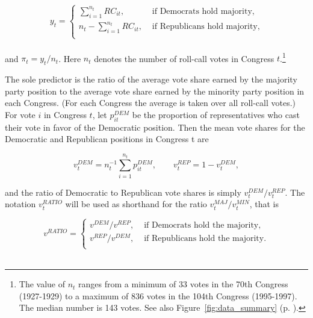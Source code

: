 \begin{equation*}
y_t =
\begin{cases} \sum_{i=1}^{n_t} RC_{it}, & \text{ if Democrats hold majority}, \\[10pt]
n_t - \sum_{i=1}^{n_t} RC_{it}, & \text{ if Republicans hold majority,} \\
\end{cases}
\end{equation*}
~\\[-12pt]
 
\noindent and $\pi_t = y_t / n_t$. Here $n_t$ denotes the number of roll-call votes in Congress $t$.\footnote{The value of $n_t$ ranges from a minimum of 33 votes in the 70th Congress (1927-1929) to a maximum of 836 votes in the 104th Congress (1995-1997). The median number is 143 votes. See also Figure~\ref{fig:data_summary} (p. \pageref{fig:data_summary}).} 

The sole predictor is the ratio of the average vote share earned by the majority party position to the average vote share earned by the minority party position in each Congress.  (For each Congress the average is taken over all roll-call votes.)  For vote $i$ in Congress $t$, let $p_{it}^{DEM}$ be the proportion of representatives who cast their vote in favor of the Democratic position.  Then the mean vote shares for the Democratic and Republican positions in Congress t are

\begin{equation*}
v_t^{DEM} = n_t^{-1} \sum_{i=1}^{n_t} p_{it}^{DEM}, \qquad v_t^{REP} = 1 - v_t^{DEM},
\end{equation*}

\noindent and the ratio of Democratic to Republican vote shares is simply $v_t^{DEM} / v_t^{REP}$. The notation $v_t^{RATIO}$ will be used as shorthand for the ratio $v_t^{MAJ} / v_t^{MIN}$, that is 

\begin{equation*}
v^{RATIO} = 
\begin{cases} 
v^{DEM} / v^{REP}, & \text{ if Democrats hold the majority,} \\[10pt]
v^{REP} / v^{DEM}, & \text{ if Republicans hold the majority.} \\
\end{cases}
\end{equation*}
~\\[-12pt]


